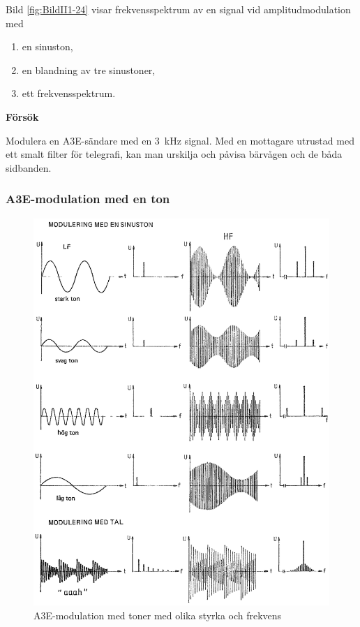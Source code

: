 Bild \ref{fig:BildII1-24} visar frekvensspektrum av en signal vid
amplitudmodulation med

\begin{enumerate}[label=\alph*.,noitemsep]
\item en sinuston,
\item en blandning av tre sinustoner,
\item ett frekvensspektrum.
\end{enumerate}

\textbf{Försök}

Modulera en A3E-sändare med en 3~kHz signal.
Med en mottagare utrustad med ett smalt filter för telegrafi, kan man urskilja
och påvisa bärvågen och de båda sidbanden.

\subsubsection{A3E-modulation med en ton}

\begin{figure}
\includegraphics[width=\textwidth]{images/cropped_pdfs/bild_2_1-25.pdf}
\caption{A3E-modulation med toner med olika styrka och frekvens}
\label{fig:BildII1-25}
\end{figure}

